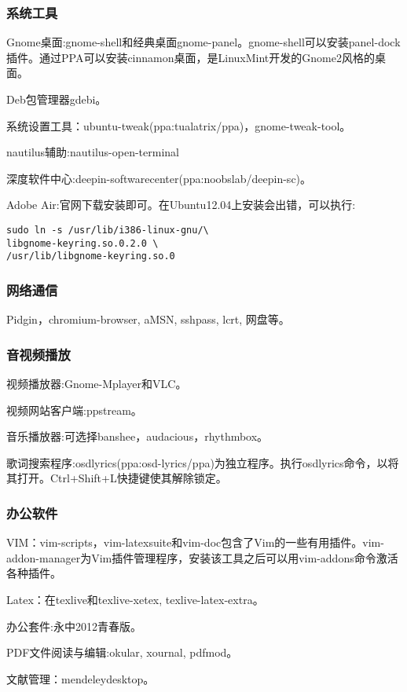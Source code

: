\subsubsection{系统工具}
Gnome桌面:gnome-shell和经典桌面gnome-panel。gnome-shell可以安装panel-dock插件。通过PPA可以安装cinnamon桌面，是LinuxMint开发的Gnome2风格的桌面。

Deb包管理器gdebi。

系统设置工具：ubuntu-tweak(ppa:tualatrix/ppa)，gnome-tweak-tool。

nautilus辅助:nautilus-open-terminal

深度软件中心:deepin-softwarecenter(ppa:noobslab/deepin-sc)。

Adobe Air:官网下载安装即可。在Ubuntu12.04上安装会出错，可以执行:
\begin{verbatim}
sudo ln -s /usr/lib/i386-linux-gnu/\
libgnome-keyring.so.0.2.0 \
/usr/lib/libgnome-keyring.so.0
\end{verbatim}

\subsubsection{网络通信}
Pidgin，chromium-browser, aMSN, sshpass, lcrt, 网盘等。

\subsubsection{音视频播放}
视频播放器:Gnome-Mplayer和VLC。

视频网站客户端:ppstream。

音乐播放器:可选择banshee，audacious，rhythmbox。

歌词搜索程序:osdlyrics(ppa:osd-lyrics/ppa)为独立程序。执行osdlyrics命令，以将其打开。Ctrl+Shift+L快捷键使其解除锁定。

\subsubsection{办公软件}

VIM：vim-scripts，vim-latexsuite和vim-doc包含了Vim的一些有用插件。vim-addon-manager为Vim插件管理程序，安装该工具之后可以用vim-addons命令激活各种插件。

Latex：在texlive和texlive-xetex, texlive-latex-extra。

办公套件:永中2012青春版。

PDF文件阅读与编辑:okular, xournal, pdfmod。 

文献管理：mendeleydesktop。

